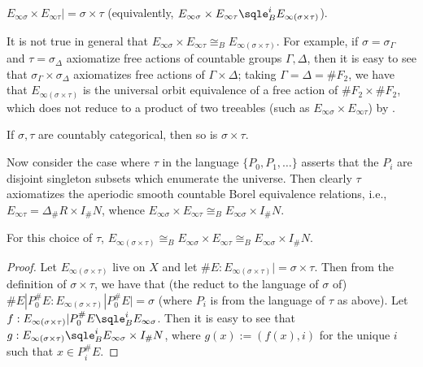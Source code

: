 \documentclass[11pt]{article}
\begin{document}
\begin{proposition}
$E_{\infty\sigma} \times E_{\infty\tau} |= \sigma \times \tau$ (equivalently, $E_{\infty\sigma} \times E_{\infty\tau} \sqle_B^i E_{\infty(\sigma \times \tau)}$).
\end{proposition}

\begin{remark}
It is not true in general that $E_{\infty\sigma} \times E_{\infty\tau} \cong_B E_{\infty(\sigma \times \tau)}$.  For example, if $\sigma = \sigma_\Gamma$ and $\tau = \sigma_\Delta$ axiomatize free actions of countable groups $\Gamma, \Delta$, then it is easy to see that $\sigma_\Gamma \times \sigma_\Delta$ axiomatizes free actions of $\Gamma \times \Delta$; taking $\Gamma = \Delta = \#F_2$, we have that $E_{\infty(\sigma \times \tau)}$ is the universal orbit equivalence of a free action of $\#F_2 \times \#F_2$, which does not reduce to a product of two treeables (such as $E_{\infty\sigma} \times E_{\infty\tau}$) by \cite[8.1(iii)]{HK}.
\end{remark}

\begin{proposition}
If $\sigma, \tau$ are countably categorical, then so is $\sigma \times \tau$.
\end{proposition}

Now consider the case where $\tau$ in the language $\{P_0, P_1, \dotsc\}$ asserts that the $P_i$ are disjoint singleton subsets which enumerate the universe.  Then clearly $\tau$ axiomatizes the aperiodic smooth countable Borel equivalence relations, i.e., $E_{\infty\tau} = \Delta_\#R \times I_\#N$, whence $E_{\infty\sigma} \times E_{\infty\tau} \cong_B E_{\infty\sigma} \times I_\#N$.

\begin{proposition}
For this choice of $\tau$, $E_{\infty(\sigma \times \tau)} \cong_B E_{\infty\sigma} \times E_{\infty\tau} \cong_B E_{\infty\sigma} \times I_\#N$.
\end{proposition}
\begin{proof}
Let $E_{\infty(\sigma \times \tau)}$ live on $X$ and let $\#E : E_{\infty(\sigma \times \tau)} |= \sigma \times \tau$.  Then from the definition of $\sigma \times \tau$, we have that (the reduct to the language of $\sigma$ of) $\#E|P_0^\#E : E_{\infty(\sigma \times \tau)}|P_0^\#E |= \sigma$ (where $P_i$ is from the language of $\tau$ as above).  Let $f : E_{\infty(\sigma \times \tau)}|P_0^\#E \sqle_B^i E_{\infty\sigma}$.  Then it is easy to see that $g : E_{\infty(\sigma \times \tau)} \sqle_B^i E_{\infty\sigma} \times I_\#N$, where $g(x) := (f(x), i)$ for the unique $i$ such that $x \in P_i^\#E$.
\end{proof}
\end{document}
